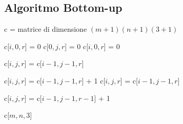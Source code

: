 \subsection{Algoritmo Bottom-up}
\begin{algorithm}[H]
    \caption{LCS-atmost-3-red-length}
    \begin{algorithmic}

            \State c = matrice di dimensione $(m+1)(n+1)(3+1)$

                    \State c[$i,0,r$] = 0
                \EndFor
            \EndFor
                    \State c[$0,j,r$] = 0
                \EndFor
            \EndFor
                    \State c[$i,0,r$] = 0
                \EndFor
            \EndFor
        \EndProcedure

                        \State c[$i,j,r$] = c[$i-1,j-1,r$]

                    \Else
                            \State c[$i,j,r$] = c[$i-1,j-1,r$] + 1
                        \Else
                                \State c[$i,j,r$] = c[$i-1,j-1,r$]

                            \Else
                                \State c[$i,j,r$] = c[$i-1,j-1,r-1$] + 1
                            \EndIf
                        \EndIf
                    \EndIf
                \EndFor
            \EndFor
        \EndFor

        \State \Return c[$m,n,3$]
    \end{algorithmic}
\end{algorithm}

